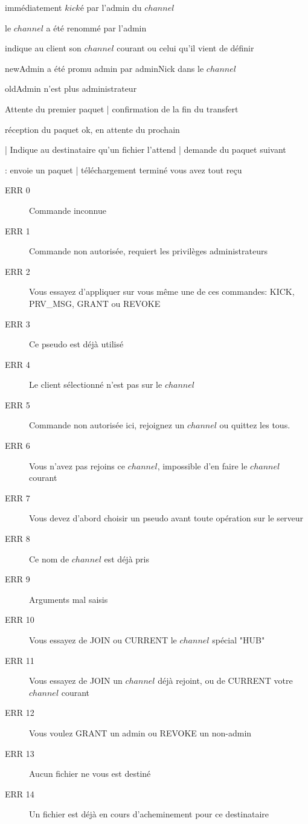 \documentclass[12pt]{article}
\begin{document}
\begin{description}
    immédiatement $kické$ par l'admin du $channel$
    \item[---REN <channel> <adminNick> <newName>]  le $channel$ a été renommé par l'admin
    \item[---CURRENT <currentChannel>]  indique au client son $channel$ courant ou celui qu'il vient de définir
    \item[---GRANT <channel> <adminNick> <newAdmin>]  newAdmin a été promu admin par adminNick dans le $channel$
    \item[---REVOKE <channel> <adminNick> <oldAdmin>]  oldAdmin n'est plus administrateur
    \item[---SEND <0 | 1>]  Attente du premier paquet | confirmation de la fin du transfert
    \item[---SENDF]  réception du paquet ok, en attente du prochain
    \item[---RECV <sender\_nick | >] | Indique au destinataire qu'un fichier l'attend | demande du paquet suivant
    \item[---RECVF <file\_package | >] :  envoie un paquet | téléchargement terminé vous avez tout reçu
    \\
\end{description}



\begin{description}
    \item[ERR 0] Commande inconnue
    \item[ERR 1] Commande non autorisée, requiert les privilèges administrateurs
    \item[ERR 2] Vous essayez d'appliquer sur vous même une de ces commandes: KICK, PRV\_MSG, GRANT ou REVOKE
    \item[ERR 3] Ce pseudo est déjà utilisé
    \item[ERR 4] Le client sélectionné n'est pas sur le $channel$
    \item[ERR 5] Commande non autorisée ici, rejoignez un $channel$ ou quittez les tous. 
    \item[ERR 6] Vous n'avez pas rejoins ce $channel$, impossible d'en faire le $channel$ courant
    \item[ERR 7] Vous devez d'abord choisir un pseudo avant toute opération sur le serveur
    \item[ERR 8] Ce nom de $channel$ est déjà pris
    \item[ERR 9] Arguments mal saisis
    \item[ERR 10] Vous essayez de JOIN ou CURRENT le $channel$ spécial "HUB"
    \item[ERR 11] Vous essayez de JOIN un $channel$ déjà rejoint, ou de CURRENT votre $channel$ courant
    \item[ERR 12] Vous voulez GRANT un admin ou REVOKE un non-admin
    \item[ERR 13] Aucun fichier ne vous est destiné
    \item[ERR 14] Un fichier est déjà en cours d'acheminement pour ce destinataire
\end{description}
\end{document}

